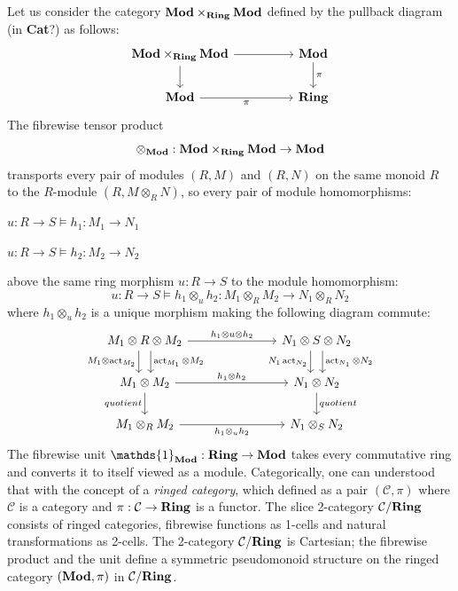 \documentclass[8pt]{article}
\theoremstyle{definition}
\theoremstyle{definition}
\theoremstyle{definition}
\theoremstyle{definition}
\theoremstyle{definition}
\theoremstyle{definition}
\theoremstyle{definition}
\theoremstyle{definition}
\theoremstyle{definition}
\theoremstyle{definition}
\theoremstyle{definition}
\theoremstyle{definition}
\theoremstyle{definition}
\theoremstyle{definition}
\theoremstyle{question}
\begin{document}
Let us consider the category ${\bf Mod} \times_{\bf Ring} {\bf Mod}$ defined by the pullback diagram (in {\bf Cat}?) as follows:
\[
\begin{tikzcd}
  {\bf Mod} \times_{\bf Ring} {\bf Mod} \ar[d] \ar[rr] && {\bf Mod} \ar[d, "\pi"] \\
  {\bf Mod} \ar[rr, "\pi"'] && {\bf Ring}
\end{tikzcd}
\]
The fibrewise tensor product 
\[
\otimes_{\bf Mod} : {\bf Mod} \times_{\bf Ring} {\bf Mod} \to {\bf Mod}
\]
transports every pair of modules $(R, M)$ and $(R, N)$ on the same monoid $R$ to the $R$-module $(R, M \otimes_R N)$, so every pair
of module homomorphisms:
\begin{center}
  $u : R \to S \models h_1 : M_1 \to N_1$

  $u : R \to S \models h_2 : M_2 \to N_2$
\end{center}
above the same ring morphism $u : R \to S$ to the module homomorphism:
\[
u : R \to S \models h_1 \otimes_u h_2 : M_1 \otimes_R M_2 \to N_1 \otimes_R N_2
\]
where $h_1 \otimes_u h_2$ is a unique morphism making the following diagram commute:
\[
\begin{tikzcd}
  M_1 \otimes R \otimes M_2 \ar[d, shift left=2, "\operatorname{act}_{M_1} \otimes M_2"] \ar[d, shift right=2, "M_1 \otimes \operatorname{act}_{M_2}"'] \ar[rrr, "h_1 \otimes u \otimes h_2"] &&& N_1 \otimes S \otimes N_2 \ar[d, shift left=2, "\operatorname{act}_{N_1} \otimes N_2"] \ar[d, shift right=2, "N_1 \operatorname{act}_{N_2} "']  \\
  M_1 \otimes M_2 \ar[d, "quotient"'] \ar[rrr, "h_1 \otimes h_2"] &&& N_1 \otimes N_2 \ar[d, "quotient"] \\
  M_1 \otimes_R M_2 \ar[rrr, "h_1 \otimes_u h_2"'] &&& N_1 \otimes_S N_2
\end{tikzcd}
\]
The fibrewise unit $\mathds{1}_{\bf Mod} : {\bf Ring} \to {\bf Mod}$ takes every commutative ring and converts it to itself viewed as a module.
Categorically, one can understood that with the concept of a \emph{ringed category}, which defined as a pair $(\mathcal{C}, \pi)$
where $\mathcal{C}$ is a category and $\pi : \mathcal{C} \to {\bf Ring}$ is a functor. The slice 2-category $\mathcal{C}/{\bf Ring}$
consists of ringed categories, fibrewise functions as 1-cells and natural transformations as 2-cells. The 2-category $\mathcal{C}/{\bf Ring}$
is Cartesian; the fibrewise product and the unit define a symmetric pseudomonoid structure on the ringed category $({\bf Mod}, \pi)$
in $\mathcal{C}/{\bf Ring}$.
\end{document}

